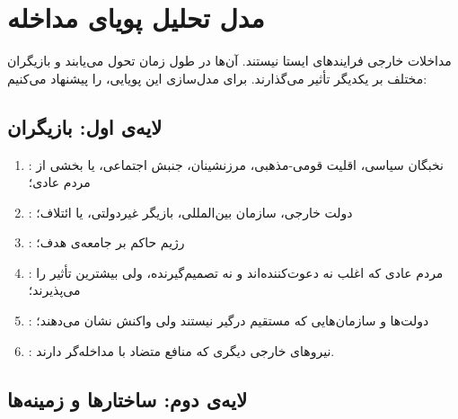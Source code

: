 \section{مدل تحلیل پویای مداخله}
\label{sec:ch04-dynamic}

مداخلات خارجی فرایندهای ایستا نیستند. آن‌ها در طول زمان تحول
می‌یابند و بازیگران مختلف بر یکدیگر تأثیر می‌گذارند. برای
مدل‌سازی این پویایی،
را پیشنهاد می‌کنیم:

\subsection{لایه‌ی اول: بازیگران}
\label{subsec:ch04-actors}

\begin{tcolorbox}[mybox,
	title={بازیگران اصلی در فرایند مداخله}]
	\begin{enumerate}[label=\textbf{\arabic*.}, nosep, rightmargin=1em]
		\item {}: نخبگان سیاسی، اقلیت قومی-مذهبی،
		مرزنشینان، جنبش اجتماعی، یا بخشی از مردم عادی؛
		\item {}: دولت خارجی، سازمان بین‌المللی،
		بازیگر غیردولتی، یا ائتلاف؛
		\item {}: رژیم حاکم بر جامعه‌ی هدف؛
		\item {}: مردم عادی که اغلب نه دعوت‌کننده‌اند
		و نه تصمیم‌گیرنده، ولی بیشترین تأثیر را می‌پذیرند؛
		\item {}: دولت‌ها و سازمان‌هایی که
		مستقیم درگیر نیستند ولی واکنش نشان می‌دهند؛
		\item {}: نیروهای خارجی دیگری که منافع
		متضاد با مداخله‌گر دارند.
	\end{enumerate}
\end{tcolorbox}

\subsection{لایه‌ی دوم: ساختارها و زمینه‌ها}
\label{subsec:ch04-structures}


